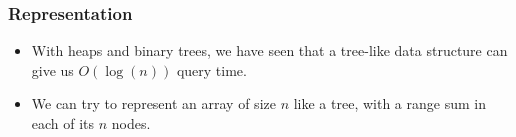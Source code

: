 \documentclass{beamer}
\begin{document}
\begin{frame}%
\frametitle{Representation}


\begin{itemize}

\item With heaps and binary trees, we have seen that a tree-like data structure
can give us $O(\log(n))$ query time.

\vspace{0.3cm}

\item<2-> We can try to represent an array of size $n$ like a tree, with a range sum in each of its $n$ nodes.


\end{itemize}

\end{frame}
\end{document}
